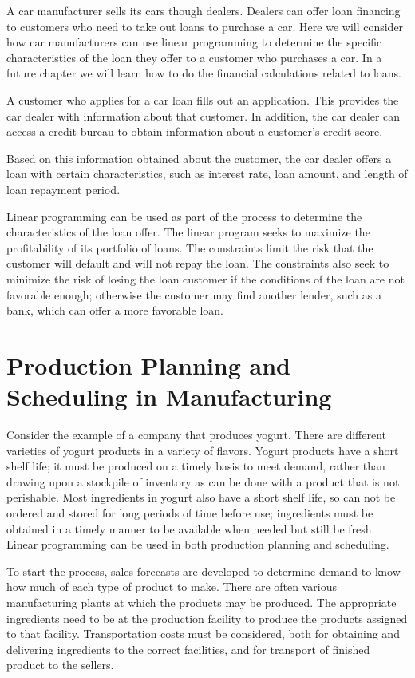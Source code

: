 A car manufacturer sells its cars though dealers. Dealers can offer loan financing to customers who need to take out loans to purchase a car. Here we will consider how car manufacturers can use linear programming to determine the specific characteristics of the loan they offer to a customer who purchases a car. In a future chapter we will learn how to do the financial calculations related to loans.

A customer who applies for a car loan fills out an application. This provides the car dealer with information about that customer. In addition, the car dealer can access a credit bureau to obtain information about a customer's credit score.

Based on this information obtained about the customer, the car dealer offers a loan with certain characteristics, such as interest rate, loan amount, and length of loan repayment period.

Linear programming can be used as part of the process to determine the characteristics of the loan offer. The linear program seeks to maximize the profitability of its portfolio of loans. The constraints limit the risk that the customer will default and will not repay the loan. The constraints also seek to minimize the risk of losing the loan customer if the conditions of the loan are not favorable enough; otherwise the customer may find another lender, such as a bank, which can offer a more favorable loan.

\section*{Production Planning and Scheduling in Manufacturing}

Consider the example of a company that produces yogurt. There are different varieties of yogurt products in a variety of flavors. Yogurt products have a short shelf life; it must be produced on a timely basis to meet demand, rather than drawing upon a stockpile of inventory as can be done with a product that is not perishable. Most ingredients in yogurt also have a short shelf life, so can not be ordered and stored for long periods of time before use; ingredients must be obtained in a timely manner to be available when needed but still be fresh. Linear programming can be used in both production planning and scheduling.

To start the process, sales forecasts are developed to determine demand to know how much of each type of product to make.
There are often various manufacturing plants at which the products may be produced. The appropriate ingredients need to be at the production facility to produce the products assigned to that facility. Transportation costs must be considered, both for obtaining and delivering ingredients to the correct facilities, and for transport of finished product to the sellers.

